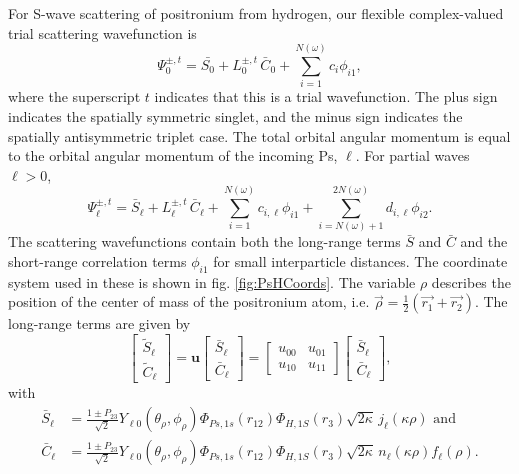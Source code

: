\documentclass[preprint,showpacs,preprintnumbers,amsmath,amssymb]{revtex4}
\begin{document}
For S-wave scattering of positronium from hydrogen, our flexible complex-valued trial scattering wavefunction is
\begin{equation}
\Psi_0^{\pm,t} = \bar{S_0} + L_0^{\pm,t} \, \bar{C}_0 + \sum_{i=1}^{N(\omega)} c_i \phi_{i1},
\label{eq:TrialWave}
\end{equation}
where the superscript $t$ indicates that this is a trial wavefunction. The plus sign indicates the spatially symmetric singlet, and the minus sign indicates the spatially antisymmetric triplet case. The total orbital angular momentum is equal to the orbital angular momentum of the incoming Ps, $\ell$. For partial waves $\ell > 0$,
\begin{equation}
\Psi_\ell^{\pm,t} = \bar{S}_\ell + L^{\pm,t}_\ell \, \bar{C}_\ell + \sum_{i=1}^{N(\omega)} c_{i,\ell} \phi_{i1} + \!\!\!\sum_{i=N(\omega)+1}^{2N(\omega)} \!\! d_{i,\ell} \phi_{i2}.
\label{eq:TrialWaveHigher}
\end{equation}
The scattering wavefunctions contain both the long-range terms $\bar{S}$ and $\bar{C}$ and the short-range correlation terms $\phi_{i1}$ for small interparticle distances. The coordinate system used in these is shown in fig. \ref{fig:PsHCoords}. The variable $\rho$ describes the position of the center of mass of the positronium atom, i.e. $\vec{\rho} = \frac{1}{2}\left(\vec{r_1} + \vec{r_2}\right)$. The long-range terms are given by
\begin{equation}
\label{eq:SCPhiDef}
\begin{bmatrix}
\widetilde{S}_\ell \\ \widetilde{C}_\ell
\end{bmatrix} = \textbf{u}  \begin{bmatrix}
\bar{S}_\ell \\ \bar{C}_\ell
\end{bmatrix} = \begin{bmatrix}
u_{00} & u_{01} \\  u_{10} & u_{11}
\end{bmatrix}
\begin{bmatrix}
\bar{S}_\ell \\ \bar{C}_\ell
\end{bmatrix}, 
\end{equation}
with
\begin{subequations}
\label{eq:SCBarPhiDef}
\begin{align}
\bar{S}_\ell &= \frac{1\pm P_{23}}{\sqrt{2}}Y_{\ell 0}(\theta_\rho,\phi_\rho)\Phi_{Ps,1s}\left(r_{12}\right) \Phi_{H,1S}\left(r_3\right) \sqrt{2\kappa} \,j_\ell\left(\kappa\rho\right) \text{ and} \label{eq:SBar} \\
\bar{C}_\ell &= \frac{1\pm P_{23}}{\sqrt{2}}Y_{\ell 0}(\theta_\rho,\phi_\rho)\Phi_{Ps,1s}\left(r_{12}\right) \Phi_{H,1S}\left(r_3\right) \sqrt{2\kappa} \,n_\ell\left(\kappa\rho\right) f_\ell(\rho). \label{eq:CBar}
\end{align}
\end{subequations}
\end{document}
